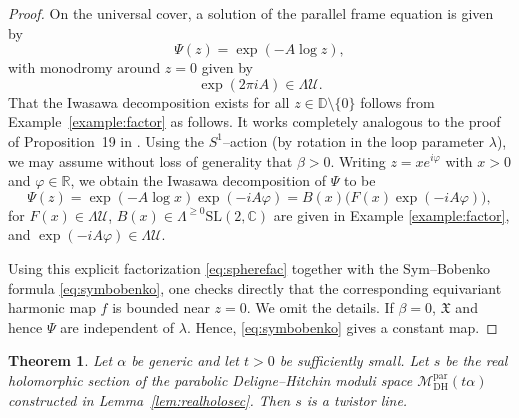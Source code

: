 \documentclass[12pt,a4paper]{amsart}
\newtheorem{theorem}{Theorem}[section]
\theoremstyle{definition}
\theoremstyle{remark}
\newcommand{\R}{\mathbb R}
\newcommand{\C}{\mathbb C}
\begin{document}
\begin{proof}
On the universal cover, a solution of the parallel frame equation is given by
\[
\Psi(z)=\exp(-A\log z),
\]
with monodromy around $z=0$ given by
\[
\exp(2\pi i A)\in\Lambda\mathcal U.
\]
That the Iwasawa decomposition exists for all $z\in\mathbb D\setminus\{0\}$ follows
from Example~\ref{example:factor} as follows. %
It works completely analogous to the proof of Proposition~19 in \cite{CHHT}.
Using the $S^1$--action (by rotation in the loop parameter $\lambda$), we may
assume without loss of generality that $\beta>0$.
Writing $z=x e^{i\varphi}$ with $x>0$ and $\varphi\in\R$, we obtain the Iwasawa decomposition of $\Psi$ to be
\begin{equation}\label{eq:spherefac}
\Psi(z)
=
\exp(-A\log x)\exp(-iA\varphi)
=
B(x)\bigl(F(x)\exp(-iA\varphi)\bigr),
\end{equation}
for $F(x)\in\Lambda\mathcal U$,
$B(x)\in\Lambda^{\geq0}\mathrm{SL}(2,\C)$ are given in Example \ref{example:factor}, and $\exp(-iA\varphi)\in\Lambda\mathcal U$.

Using this explicit factorization \eqref{eq:spherefac} together with the
Sym--Bobenko formula \eqref{eq:symbobenko}, one checks directly that the
corresponding equivariant harmonic map $f$ is bounded near $z=0$.
We omit the details. If $\beta=0$, $\mathfrak X$ and hence $\Psi$ are independent of $\lambda$.
Hence, \eqref{eq:symbobenko} gives a constant map.
\end{proof}




\begin{theorem}\label{thm:twistor-lines}
Let $\alpha$ be generic and let $t>0$ be sufficiently small.
Let $s$ be the real holomorphic section of the parabolic Deligne--Hitchin moduli space
$\mathcal M_{\mathrm{DH}}^{\mathrm{par}}(t\alpha)$ constructed in
Lemma~\ref{lem:realholosec}.
Then $s$ is a twistor line.
\end{theorem}
\end{document}
